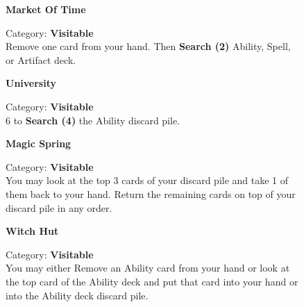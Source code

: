 \begin{figure}[h]
  \begin{minipage}[t]{0.48\textwidth}
    \centering
    \textbf{Market Of Time}\\
    \caption{Category: \textbf{Visitable}\\ Remove one card from your hand. Then \textbf{Search (2)} Ability, Spell, or Artifact deck.}
  \end{minipage}\hfill
  \begin{minipage}[t]{0.48\textwidth}
    \centering
    \textbf{University}\\
    \caption{Category: \textbf{Visitable}\\
       6  to \textbf{Search (4)} the Ability discard pile.}
  \end{minipage}
\end{figure}

\begin{figure}[h]
  \begin{minipage}[t]{0.48\textwidth}
    \centering
    \textbf{Magic Spring}\\
    \caption{Category: \textbf{Visitable}\\
      You may look at the top 3 cards of your discard pile and take 1 of them back to your hand. Return the remaining cards on top of your discard pile in any order.}
  \end{minipage}\hfill
  \begin{minipage}[t]{0.48\textwidth}
    \centering
    \textbf{Witch Hut}\\
    \caption{Category: \textbf{Visitable}\\
      You may either Remove an Ability card from your hand or look at the top card of the Ability deck and put that card into your hand or into the Ability deck discard pile.}
  \end{minipage}
\end{figure}

